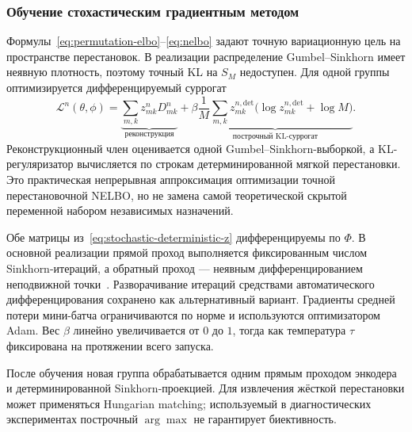 \subsubsection{Обучение стохастическим градиентным методом}
\label{ssec:sgd}

Формулы~\eqref{eq:permutation-elbo}--\eqref{eq:nelbo} задают точную вариационную цель на
пространстве перестановок. В реализации распределение Gumbel--Sinkhorn имеет неявную
плотность, поэтому точный KL на $S_M$ недоступен. Для одной группы оптимизируется
дифференцируемый суррогат
\begin{equation}
\mathcal{L}^n(\theta,\phi)
=\underbrace{\sum_{m,k}z^n_{mk}D^n_{mk}}_{\text{реконструкция}}
+\beta\underbrace{\frac{1}{M}\sum_{m,k}z^{n,\mathrm{det}}_{mk}
\bigl(\log z^{n,\mathrm{det}}_{mk}+\log M\bigr)}_{\text{построчный KL-суррогат}}.
\label{eq:per-group-loss}
\end{equation}
Реконструкционный член оценивается одной Gumbel--Sinkhorn-выборкой, а KL-регуляризатор
вычисляется по строкам детерминированной мягкой перестановки. Это практическая непрерывная
аппроксимация оптимизации точной перестановочной NELBO, но не замена самой теоретической
скрытой переменной набором независимых назначений.

Обе матрицы из~\eqref{eq:stochastic-deterministic-z} дифференцируемы по $\Phi$. В основной
реализации прямой проход выполняется фиксированным числом Sinkhorn-итераций, а обратный
проход --- неявным дифференцированием неподвижной точки~\cite{eisenberger2022implicit}.
Разворачивание итераций средствами автоматического дифференцирования сохранено как
альтернативный вариант. Градиенты средней потери мини-батча ограничиваются по норме и
используются оптимизатором Adam. Вес $\beta$ линейно увеличивается от $0$ до $1$, тогда как
температура $\tau$ фиксирована на протяжении всего запуска.

После обучения новая группа обрабатывается одним прямым проходом энкодера и
детерминированной Sinkhorn-проекцией. Для извлечения жёсткой перестановки может применяться
Hungarian matching; используемый в диагностических экспериментах построчный $\arg\max$ не
гарантирует биективность.


